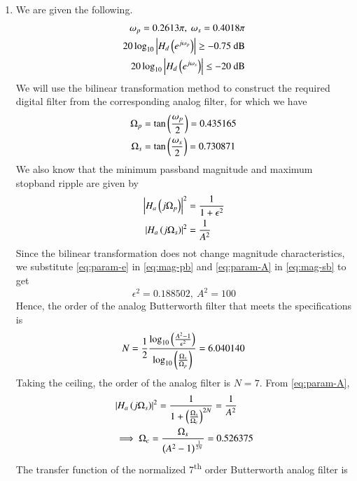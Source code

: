 \documentclass[journal,12pt,twocolumn]{IEEEtran}
\begin{document}
\begin{enumerate}[label=\theenumi.]
    \item We are given the following.
    \begin{align}
        \omega_p = 0.2613\pi,\ \omega_s = 0.4018\pi \\
        20\log_{10}\left\vert H_d\left(e^{j\omega_p}\right)\right\vert \ge -0.75 \text{ dB} \label{eq:mag-pb} \\
        20\log_{10}\left\vert H_d\left(e^{j\omega_s}\right)\right\vert \le -20 \text{ dB} \label{eq:mag-sb}
    \end{align}
    We will use the bilinear transformation method to construct the required
    digital filter from the corresponding analog filter, for which we have
    \begin{align}
        \Omega_p &= \tan\left(\frac{\omega_p}{2}\right) = 0.435165 \label{eq:Omega-p} \\
        \Omega_s &= \tan\left(\frac{\omega_s}{2}\right) = 0.730871 \label{eq:Omega-s}
    \end{align}
    We also know that the minimum passband magnitude and maximum stopband
    ripple are given by
    \begin{align}
        \left\vert H_a\left(j\Omega_p\right)\right\vert^2 &= \frac{1}{1+\epsilon^2} \label{eq:param-e} \\
        \left\vert H_a\left(j\Omega_s\right)\right\vert^2 &= \frac{1}{A^2} \label{eq:param-A}
    \end{align}
    Since the bilinear transformation does not change magnitude characteristics,
    we substitute \eqref{eq:param-e} in \eqref{eq:mag-pb} and \eqref{eq:param-A}
    in \eqref{eq:mag-sb} to get
    \begin{equation}
        \epsilon^2 = 0.188502,\ A^2 = 100
    \end{equation}
    Hence, the order of the analog Butterworth filter that meets the
    specifications is
    \begin{equation}
        N = \frac{1}{2}\frac{\log_{10}\left(\frac{A^2-1}{\epsilon^2}\right)}{\log_{10}\left(\frac{\Omega_s}{\Omega_p}\right)} = 6.040140
    \end{equation}
    Taking the ceiling, the order of the analog filter is \(N = 7\). From
    \eqref{eq:param-A},
    \begin{align}
        &\left\vert H_a\left(j\Omega_s\right)\right\vert^2 = \frac{1}{1 + \left(\frac{\Omega_s}{\Omega_c}\right)^{2N}} = \frac{1}{A^2} \\
        &\implies \Omega_c = \frac{\Omega_s}{\left(A^2-1\right)^{\frac{1}{2N}}} = 0.526375
    \end{align}
    The transfer function of the normalized 7\textsuperscript{th} order
    Butterworth analog filter is

\end{enumerate}
\end{document}
